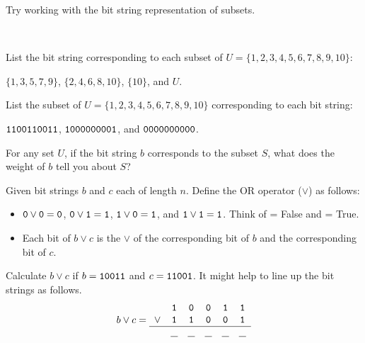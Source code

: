 Try working with the bit string representation of subsets.

\begin{act}
\label{act_bs_rep_subsets}
~
    \begin{apart}
        \item List the bit string corresponding to each subset of $U = \{1,2,3,4,5,6,7,8,9,10\}$: 
            \begin{center}
                $\{1,3,5,7,9\}$, $\{2, 4, 6, 8, 10\}$, $\{10\}$, and $U$.
            \end{center}
            
        \item List the subset of $U = \{1,2,3,4,5,6,7,8,9,10\}$ corresponding to each bit string: 
            \begin{center}
                $\texttt{1100110011}$, $\texttt{1000000001}$, and $\texttt{0000000000}$.
            \end{center}  
        
        \item For any set $U$, if the bit string $b$ corresponds to the subset $S$, what does the weight of $b$ tell you about $S$?

        \item \label{part_OR} Given bit strings $b$ and $c$ each of length $n$.  Define the OR operator ($\lor$) as follows:
            \begin{itemize}
                \item $\texttt{0} \lor \texttt{0} = \texttt{0}$, $\texttt{0} \lor \texttt{1} = \texttt{1}$, $\texttt{1} \lor \texttt{0} = \texttt{1}$, and $\texttt{1} \lor \texttt{1} = \texttt{1}$.  Think of  = False and  = True.  
                \item Each bit of $b \lor c$ is the $\lor$ of the corresponding bit of $b$ and the corresponding bit of $c$. 
            \end{itemize}
        Calculate $b \lor c$ if $b = \texttt{10011}$ and $c = \texttt{11001}$. It might help to line up the bit strings as follows.
            $$b \lor c = 
                \begin{array}{cccccc} 
                & \texttt{1} & \texttt{0} & \texttt{0} & \texttt{1} & \texttt{1} \\
                \lor  & \texttt{1} & \texttt{1} & \texttt{0} & \texttt{0} & \texttt{1} \\ \hline 
                & \underline{\hspace{.1in}} & \underline{\hspace{.1in}} & \underline{\hspace{.1in}} & \underline{\hspace{.1in}} & \underline{\hspace{.1in}}  \end{array}$$
                

\end{apart}
\end{act}
